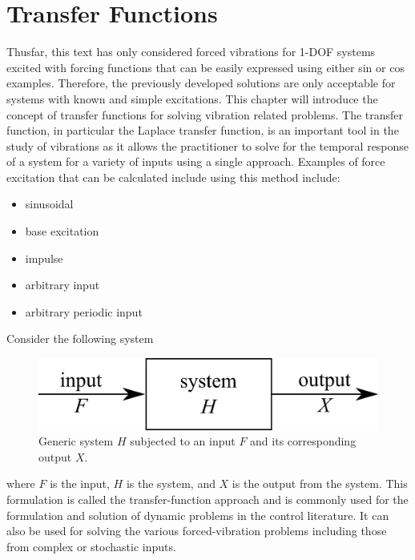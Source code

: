 \documentclass[12pt,letter]{article}
\numberwithin{ex}{section} %
\numberwithin{re}{section} %
\numberwithin{equation}{section}	%
\begin{document}
	
	\setcounter{section}{2}	
	\setcounter{figure}{0}    
	\renewcommand\thefigure{\thesection.\arabic{figure}}


	\section{Transfer Functions}

		Thusfar, this text has only considered forced vibrations for 1-DOF systems excited with forcing functions that can be easily expressed using either sin or cos examples. Therefore, the previously developed solutions are only acceptable for systems with known and simple excitations. This chapter will introduce the concept of transfer functions for solving vibration related problems. The transfer function, in particular the Laplace transfer function, is an important tool in the study of vibrations as it allows the practitioner to solve for the temporal response of a system for a variety of inputs using a single approach. Examples of force excitation that can be calculated include using this method include:
		\begin{itemize}
			\item sinusoidal
			\item base excitation
			\item impulse
			\item arbitrary input
			\item arbitrary periodic input
		\end{itemize}

			Consider the following system

			\begin{figure}[H]
				\centering
				\includegraphics[]{../figures/control_system.png}
				\caption{Generic system $H$ subjected to an input $F$ and its corresponding output $X$.}
				\label{fig:control_system}
			\end{figure}

			\noindent where $F$ is the input, $H$ is the system, and $X$ is the output from the system. This formulation is called the transfer-function approach and is commonly used for the formulation and solution of dynamic problems in the control literature. It can also be used for solving the various forced-vibration problems including those from complex or stochastic inputs. 
\end{document}
